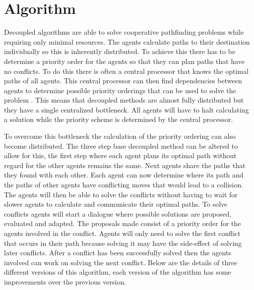 \section{Algorithm}\label{sec:method}
Decoupled algorithms are able to solve cooperative pathfinding problems while
requiring only minimal resources. The agents calculate paths to their
destination individually so this is inherently distributed. To achieve this
there has to be determine a  priority order for the agents so that they can
plan paths that have no conflicts. To do this there is often a central
processor that knows the optimal paths of all agents. This central processor
can then
find dependencies between agents to determine possible priority orderings that
can be used to solve the problem \cite{latombe1991,bennewitz2002}. This means
that decoupled methods are almost fully distributed but they have a single
centralized bottleneck. All agents will have to halt calculating a solution
while the priority scheme is determined by the central processor.

To overcome this bottleneck the calculation of the priority ordering can also
become distributed. The three step base decoupled method can be
altered to allow for this, the first step where each agent plans its optimal
path without regard for the other agents remains the same. Next agents share
the paths that they found with each other. Each agent can now determine where
its path and the paths of other agents
have conflicting moves that would lead to a collision. The agents will then be
able to solve the conflicts without having to wait for slower agents to
calculate and communicate their optimal paths. To solve conflicts agents will
start a dialogue where possible solutions are proposed, evaluated and adapted.
The proposals made consist of a priority order for the agents involved in the
conflict. Agents will only need to solve the first conflict that occurs in
their path because solving it may have the side-effect of solving later
conflicts. After a conflict has been successfully solved then the agents
involved can work on solving the next conflict.
Below are the details of three different versions of this algorithm, each
version of the algorithm has some improvements over the previous version.


